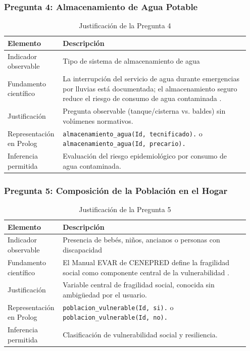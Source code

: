 \documentclass[12pt, letterpaper]{article}
\begin{document}
\subsubsection*{Pregunta 4: Almacenamiento de Agua Potable}
\begin{table}[H]
\centering
\caption{Justificación de la Pregunta 4}
\label{tab:p4}
\begin{tabular}{@{}p{0.2\linewidth}p{0.75\linewidth}@{}}
\toprule
\textbf{Elemento} & \textbf{Descripción} \\ \midrule
Indicador observable & Tipo de sistema de almacenamiento de agua \\
Fundamento científico & La interrupción del servicio de agua durante emergencias por lluvias está documentada; el almacenamiento seguro reduce el riesgo de consumo de agua contaminada \parencite{geresa_sala}. \\
Justificación & Pregunta observable (tanque/cisterna vs. baldes) sin volúmenes normativos. \\
Representación en Prolog & \texttt{almacenamiento\_agua(Id, tecnificado).} o \texttt{almacenamiento\_agua(Id, precario).} \\
Inferencia permitida & Evaluación del riesgo epidemiológico por consumo de agua contaminada. \\ \bottomrule
\end{tabular}
\end{table}

\subsubsection*{Pregunta 5: Composición de la Población en el Hogar}
\begin{table}[H]
\centering
\caption{Justificación de la Pregunta 5}
\label{tab:p5}
\begin{tabular}{@{}p{0.2\linewidth}p{0.75\linewidth}@{}}
\toprule
\textbf{Elemento} & \textbf{Descripción} \\ \midrule
Indicador observable & Presencia de bebés, niños, ancianos o personas con discapacidad \\
Fundamento científico & El Manual EVAR de CENEPRED define la fragilidad social como componente central de la vulnerabilidad \parencite{cenepred_manual_evar}. \\
Justificación & Variable central de fragilidad social, conocida sin ambigüedad por el usuario. \\
Representación en Prolog & \texttt{poblacion\_vulnerable(Id, si).} o \texttt{poblacion\_vulnerable(Id, no).} \\
Inferencia permitida & Clasificación de vulnerabilidad social y resiliencia. \\ \bottomrule
\end{tabular}
\end{table}
\end{document}
